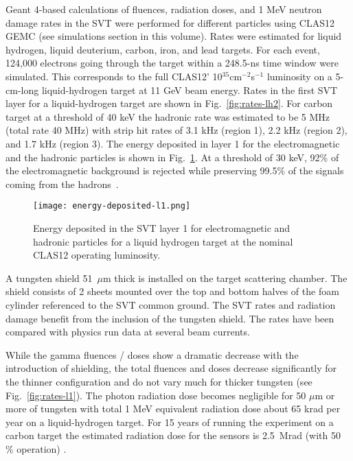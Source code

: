 Geant 4-based calculations of fluences, radiation doses, and 1 MeV neutron damage rates in the SVT were performed for different particles using CLAS12 GEMC (see simulations section in this volume). Rates were estimated for liquid hydrogen, liquid deuterium, carbon, iron, and lead targets. For each event, 124,000 electrons going through the target within a 248.5-ns time window were simulated. This corresponds to the full CLAS12' 10$^{35}$cm$^{-2}$s$^{-1}$ luminosity on a 5-cm-long liquid-hydrogen target at 11 GeV beam energy. Rates in the first SVT layer for a liquid-hydrogen target are shown in Fig.~\ref{fig:rates-lh2}. For carbon target at a threshold of 40 keV the hadronic rate was estimated to be 5 MHz (total rate 40 MHz) with strip hit rates of 3.1 kHz (region 1), 2.2 kHz (region 2), and 1.7 kHz (region 3). The energy deposited in layer 1 for the electromagnetic and the hadronic particles is shown in Fig.~\ref{fig:energy-deposited-l1}. At a threshold of 30 keV, 92$\%$ of the electromagnetic background is rejected while preserving  99.5$\%$ of the signals coming from the hadrons~\cite{TDRSVT}.

\begin{figure}[hbt] 
\centering 
\texttt{[image: energy-deposited-l1.png]}
\caption{Energy deposited in the SVT layer 1 for electromagnetic and hadronic particles for a liquid hydrogen target at the nominal CLAS12 operating luminosity.}
\label{fig:energy-deposited-l1}
\end{figure}

A tungsten shield 51~$\mu$m thick is installed on the target scattering chamber. The shield consists of 2 sheets mounted over the top and bottom halves of the foam cylinder referenced to the SVT common ground. The SVT rates and radiation damage benefit from the inclusion of the tungsten shield. The rates have been compared with physics run data at several beam currents.

While the gamma fluences / doses show a dramatic decrease with the introduction of shielding, the total fluences and doses decrease significantly for the thinner configuration and do not vary much for thicker tungsten (see Fig.~\ref{fig:rates-l1}). The photon radiation dose becomes negligible for 50 $\mu$m or more of tungsten with total 1 MeV equivalent radiation dose about 65 krad per year on a liquid-hydrogen target. For 15 years of running the experiment on a carbon target the estimated radiation dose for the sensors is 2.5~Mrad (with 50 $\%$ operation) \cite{TDRSVT}. 

